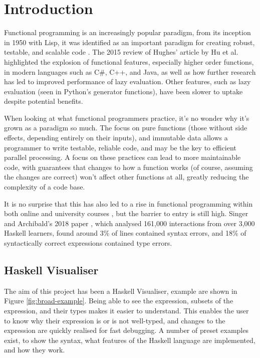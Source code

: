 \section{Introduction} \label{intro}
Functional programming is an increasingly popular paradigm, from its inception in 1950 with Lisp, it was identified as an important paradigm for creating robust, testable, and scalable code \cite{whyfunctional}. The 2015 review of Hughes' article by Hu et al. \cite{howfunctional} highlighted the explosion of functional features, especially higher order functions, in modern languages such as C\#, C++, and Java, as well as how further research has led to improved performance of lazy evaluation. Other features, such as lazy evaluation (seen in Python's generator functions), have been slower to uptake despite potential benefits. 

When looking at what functional programmers practice, it's no wonder why it's grown as a paradigm so much. The focus on pure functions (those without side effects, depending entirely on their inputs), and immutable data allows a programmer to write testable, reliable code, and may be the key to efficient parallel processing\cite{swaine2008s}. A focus on these practices can lead to more maintainable code, with guarantees that changes to how a function works (of course, assuming the changes are correct) won't affect other functions at all, greatly reducing the complexity of a code base.

It is no surprise that this has also led to a rise in functional programming within both online and university courses \cite{warwickFP, kentFP, birminghamFP, courseraFP}, but the barrier to entry is still high. Singer and Archibald's 2018 paper \cite{singer2018functional}, which analysed 161,000 interactions from over 3,000 Haskell learners, found around 3\% of lines contained syntax errors, and 18\% of syntactically correct expressions contained type errors.

\subsection{Haskell Visualiser}
The aim of this project has been a Haskell Visualiser, example are shown in Figure \ref{fig:broad-example}. Being able to see the expression, subsets of the expression, and their types makes it easier to understand. This enables the user to know why their expression is or is not well-typed, and changes to the expression are quickly realised for fast debugging. A number of preset examples exist, to show the syntax, what features of the Haskell language are implemented, and how they work.


